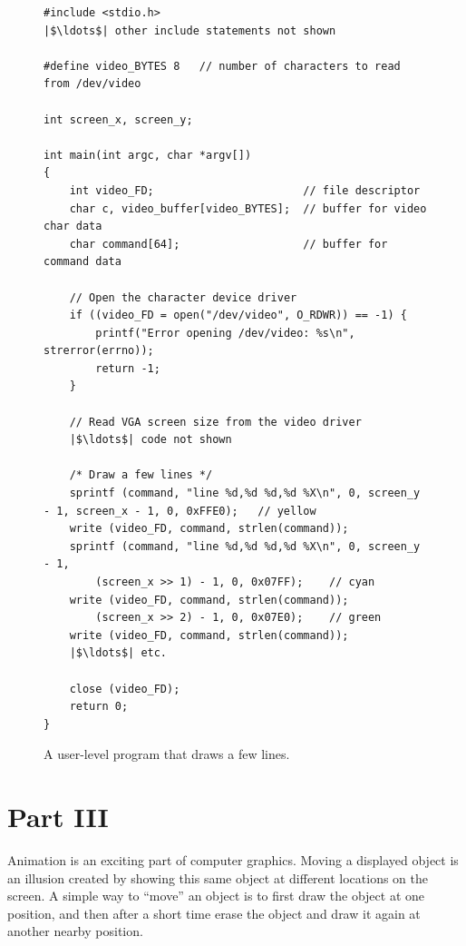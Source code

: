 \documentclass[epsfig,10pt,fullpage]{article}
\begin{document}
\lstset{language=C,numbers=none}
\begin{figure}[H]
\begin{center}
\begin{minipage}[t]{15 cm}
\begin{lstlisting}[name=part2]
#include <stdio.h>
|$\ldots$| other include statements not shown

#define video_BYTES 8	// number of characters to read from /dev/video

int screen_x, screen_y;

int main(int argc, char *argv[])
{
    int video_FD;                       // file descriptor
    char c, video_buffer[video_BYTES];  // buffer for video char data
    char command[64];                   // buffer for command data
    
    // Open the character device driver
    if ((video_FD = open("/dev/video", O_RDWR)) == -1) {
        printf("Error opening /dev/video: %s\n", strerror(errno));
        return -1;
    }
	
    // Read VGA screen size from the video driver
    |$\ldots$| code not shown

    /* Draw a few lines */
    sprintf (command, "line %d,%d %d,%d %X\n", 0, screen_y - 1, screen_x - 1, 0, 0xFFE0);	// yellow
    write (video_FD, command, strlen(command));
    sprintf (command, "line %d,%d %d,%d %X\n", 0, screen_y - 1, 
        (screen_x >> 1) - 1, 0, 0x07FF);	// cyan
    write (video_FD, command, strlen(command));
        (screen_x >> 2) - 1, 0, 0x07E0);	// green
    write (video_FD, command, strlen(command));
    |$\ldots$| etc.

    close (video_FD);
    return 0;
}
\end{lstlisting}
\end{minipage}
\caption{A user-level program that draws a few lines.}
\label{fig:part2}
\end{center}
\end{figure}

\pagebreak

\noindent
\section*{Part III}

\noindent
Animation is an exciting part of computer graphics. Moving a displayed object is an illusion 
created by showing this same object at different locations on the screen. A simple way to
``move'' an object is to first draw the object at one position, and then after a short time erase 
the object and draw it again at another nearby position.
\end{document}
